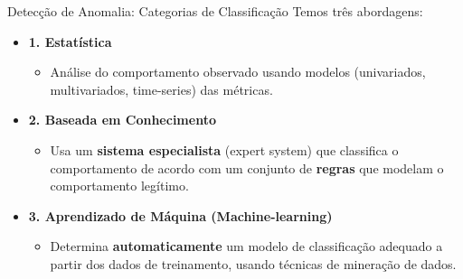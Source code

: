 \begin{frame}{Detecção de Anomalia: Categorias de Classificação}
    Temos três abordagens:
    \begin{itemize}


        \item \textbf{1. Estatística}
              \begin{itemize}
                  \item Análise do comportamento observado usando modelos (univariados, multivariados, time-series) das métricas.
              \end{itemize}

        \item \textbf{2. Baseada em Conhecimento}
              \begin{itemize}
                  \item Usa um \textbf{sistema especialista} (expert system) que classifica o comportamento de acordo com um conjunto de \textbf{regras} que modelam o comportamento legítimo.
              \end{itemize}

        \item \textbf{3. Aprendizado de Máquina (Machine-learning)}
              \begin{itemize}
                  \item Determina \textbf{automaticamente} um modelo de classificação adequado a partir dos dados de treinamento, usando técnicas de mineração de dados.
              \end{itemize}


    \end{itemize}
\end{frame}

